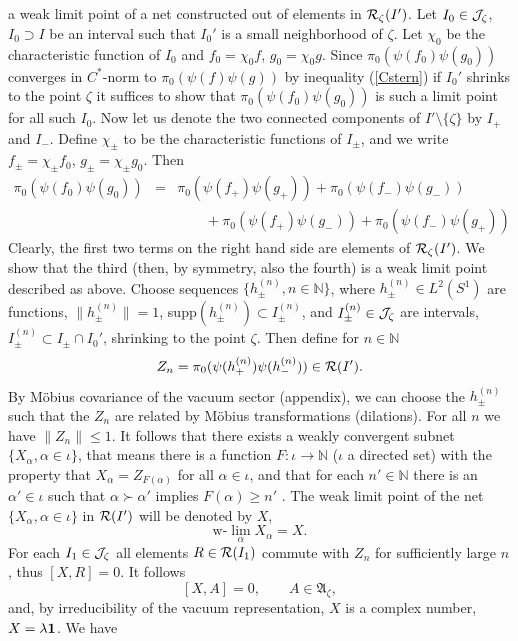 \documentclass[10pt,a4paper]{article}
\begin{document}
a weak limit point of a net constructed out of
elements in ${\cal R}_\zeta(I')$.
Let $I_0\in{\cal J}_\zeta$,
$I_0\supset I$ be an interval such that $I_0'$ is
a small neighborhood of $\zeta$. Let $\chi_0$ be the
characteristic function of $I_0$ and
$f_0=\chi_0f$, $g_0=\chi_0g$. Since
$\pi_0(\psi(f_0)\psi(g_0))$ converges in $C^*$-norm
to $\pi_0(\psi(f)\psi(g))$ by inequality (\ref{Cstern}) if
$I_0'$ shrinks to the point $\zeta$ it suffices to show
that $\pi_0(\psi(f_0)\psi(g_0))$ is such a limit
point for all such $I_0$. Now let us denote the two
connected components of $I'\setminus\{\zeta\}$ by
$I_+$ and $I_-$. Define $\chi_\pm$ to be the
characteristic functions of $I_\pm$, and we write
$f_\pm=\chi_\pm f_0$, $g_\pm=\chi_\pm g_0$. Then
\begin{eqnarray*}
\pi_0(\psi(f_0)\psi(g_0)) &=& \pi_0(\psi(f_+)\psi(g_+))
+ \pi_0(\psi(f_-)\psi(g_-)) \\ && \qquad
+ \pi_0(\psi(f_+)\psi(g_-)) + \pi_0(\psi(f_-)\psi(g_+))
\end{eqnarray*}
Clearly, the first two terms on the
right hand side are elements of ${\cal R}_\zeta(I')$.
We show that the third (then, by
symmetry, also the fourth) is a weak limit point
described as above. Choose sequences
$\{h_\pm^{(n)},n\in\mathbb{N}\}$, where
$h_\pm^{(n)}\in L^2(S^1)$ are functions,
$\|h_\pm^{(n)}\|=1$, supp$(h_\pm^{(n)})\subset
I_\pm^{(n)}$, and $I_\pm^{(n)}\in{\cal J}_\zeta$
are intervals, $I_\pm^{(n)}\subset I_\pm\cap I_0'$,
shrinking to the point $\zeta$. Then define for
$n\in\mathbb{N}$
\[ Z_n=\pi_0(\psi(h_+^{(n)})\psi(h_-^{(n)})) \in
{\cal R}(I'). \]
By M{\"o}bius covariance of the vacuum sector (appendix),
we can choose the $h_\pm^{(n)}$ such that the $Z_n$
are related by M{\"o}bius transformations (dilations).
For all $n$ we have $\|Z_n\|\le 1$. It follows that
there exists a weakly convergent subnet
$\{X_\alpha,\alpha\in\iota\}$, that means there is
a function $F:\iota\rightarrow\mathbb{N}$ ($\iota$ a
directed set) with the property that
$X_\alpha=Z_{F(\alpha)}$ for all $\alpha\in\iota$,
and that for each $n'\in\mathbb{N}$ there is an
$\alpha'\in\iota$ such that $\alpha\succ\alpha'$
implies $F(\alpha)\ge n'$ \cite{RS1}. The weak limit
point of the net $\{X_\alpha,\alpha\in\iota\}$ in
${\cal R}(I')$ will be denoted by $X$,
\[ \mbox{w-}\lim_\alpha X_\alpha = X. \]
For each $I_1\in {\cal J}_\zeta$ all elements
$R\in{\cal R}(I_1)$ commute with $Z_n$ for
sufficiently large $n$, thus $[X,R]=0$. It follows
\[ [X,A]=0, \qquad A\in\mathfrak{A}_\zeta, \]
and, by irreducibility of the vacuum representation,
$X$ is a complex number, $X=\lambda {\bf 1}$. We have
\end{document}
